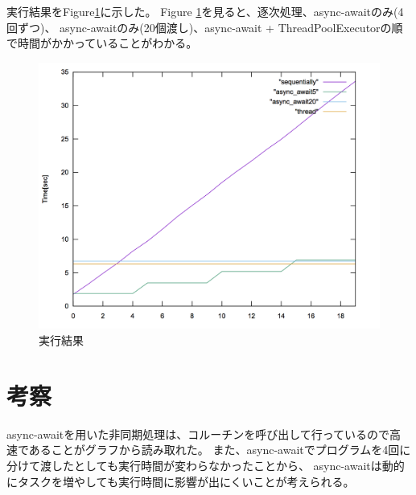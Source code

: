\documentclass[14pt, oneside]{article}     	%
\begin{document}


実行結果をFigure\ref{result}に示した。
Figure \ref{result}を見ると、逐次処理、async-awaitのみ(4回ずつ)、
async-awaitのみ(20個渡し)、async-await + ThreadPoolExecutorの順で時間がかかっていることがわかる。

% 
%
% 
%
% 
%
% 

\begin{figure}[H]
  \centering
  \includegraphics[width=13cm]{time2.png}
  \caption{実行結果}
  \label{result}
\end{figure}


\section{考察}
async-awaitを用いた非同期処理は、コルーチンを呼び出して行っているので高速であることがグラフから読み取れた。
また、async-awaitでプログラムを4回に分けて渡したとしても実行時間が変わらなかったことから、
async-awaitは動的にタスクを増やしても実行時間に影響が出にくいことが考えられる。
\end{document}

